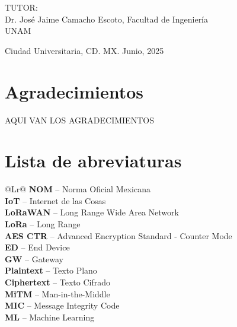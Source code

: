 \documentclass[12pt, oneside]{book}
\newcommand{\abbrentry}[3]{%
  \textbf{#1} – #2\nobreak\dotfill\nobreak#3%
}
\begin{document}
\begin{titlepage}
\begin{center}
\begin{center}
				\bigskip
				
				TUTOR: \\
				Dr. Jos\'e Jaime Camacho Escoto, Facultad de Ingenier\'ia\\ UNAM
			\end{center}
			
			\vfill
			
			\begin{center}
				{Ciudad Universitaria, CD. MX. Junio, 2025}\\
			\end{center}
			\cleardoublepage
		\end{center}
	\end{titlepage}




\chapter*{Agradecimientos}

AQUI VAN LOS AGRADECIMIENTOS

\tableofcontents %
\listoffigures %
\listoftables %


\chapter*{Lista de abreviaturas}
\begin{tabularx}{\linewidth}{@{}Lr@{}}
  \abbrentry{NOM}{Norma Oficial Mexicana}{}\\
  \abbrentry{IoT}{Internet de las Cosas}{}\\
  \abbrentry{LoRaWAN}{Long Range Wide Area Network}{}\\
  \abbrentry{LoRa}{Long Range}{}\\
  \abbrentry{AES CTR}{Advanced Encryption Standard - Counter Mode}{}\\
  \abbrentry{ED}{End Device}{}\\
  \abbrentry{GW}{Gateway}{}\\
  \abbrentry{Plaintext}{Texto Plano}{}\\
  \abbrentry{Ciphertext}{Texto Cifrado}{}\\
  \abbrentry{MiTM}{Man-in-the-Middle}{}\\
  \abbrentry{MIC}{Message Integrity Code}{}\\
  \abbrentry{ML}{Machine Learning}{}\\
\end{tabularx}
\end{document}
